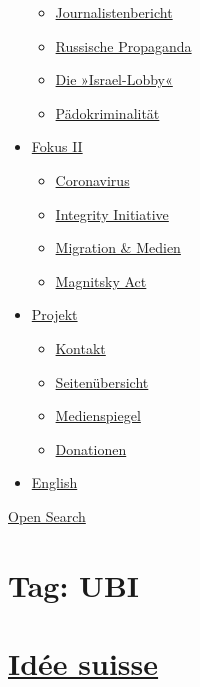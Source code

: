 \begin{itemize}
  \begin{itemize}
  \tightlist
  \item
    \href{https://swprs.org/bericht-eines-journalisten/}{Journalistenbericht}
  \item
    \href{https://swprs.org/russische-propaganda/}{Russische Propaganda}
  \item
    \href{https://swprs.org/die-israel-lobby-fakten-und-mythen/}{Die
    »Israel-Lobby«}
  \item
    \href{https://swprs.org/geopolitik-und-paedokriminalitaet/}{Pädokriminalität}
  \end{itemize}
\item
  \href{https://swprs.org/migration-und-medien/}{Fokus II}

  \begin{itemize}
  \tightlist
  \item
    \href{https://swprs.org/covid-19-hinweis-ii/}{Coronavirus}
  \item
    \href{https://swprs.org/die-integrity-initiative/}{Integrity
    Initiative}
  \item
    \href{https://swprs.org/migration-und-medien/}{Migration \& Medien}
  \item
    \href{https://swprs.org/der-fall-magnitsky/}{Magnitsky Act}
  \end{itemize}
\item
  \href{https://swprs.org/kontakt/}{Projekt}

  \begin{itemize}
  \tightlist
  \item
    \href{https://swprs.org/kontakt/}{Kontakt}
  \item
    \href{https://swprs.org/uebersicht/}{Seitenübersicht}
  \item
    \href{https://swprs.org/medienspiegel/}{Medienspiegel}
  \item
    \href{https://swprs.org/donationen/}{Donationen}
  \end{itemize}
\item
  \href{https://swprs.org/contact/}{English}
\end{itemize}

\protect\hyperlink{}{Open Search}

\hypertarget{tag-ubi}{%
\section{Tag: UBI}\label{tag-ubi}}

\hypertarget{iduxe9e-suisse}{%
\section{\texorpdfstring{\href{https://swprs.org/2017/03/01/srg-idee-suisse/}{Idée
suisse}}{Idée suisse}}\label{iduxe9e-suisse}}


